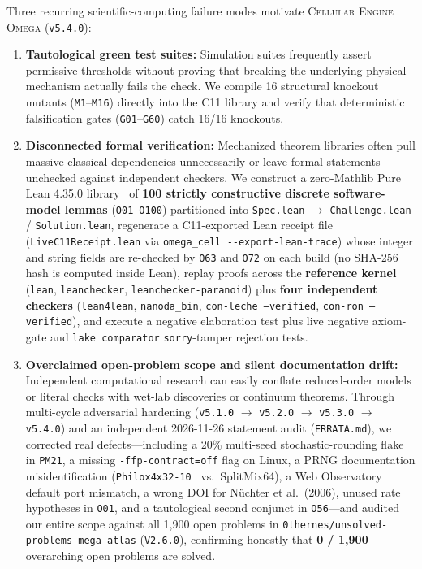 \documentclass[11pt,reqno]{amsart}
\begin{document}
Three recurring scientific-computing failure modes motivate \textsc{Cellular Engine Omega} (\texttt{v5.4.0}):
\begin{enumerate}
  \item \textbf{Tautological green test suites:} Simulation suites frequently assert permissive thresholds without proving that breaking the underlying physical mechanism actually fails the check. We compile 16 structural knockout mutants (\texttt{M1}--\texttt{M16}) directly into the C11 library and verify that deterministic falsification gates (\texttt{G01}--\texttt{G60}) catch 16/16 knockouts.
  \item \textbf{Disconnected formal verification:} Mechanized theorem libraries often pull massive classical dependencies unnecessarily or leave formal statements unchecked against independent checkers. We construct a zero-Mathlib Pure Lean 4.35.0 library~\cite{demoura2021lean4} of \textbf{100 strictly constructive discrete software-model lemmas} (\texttt{O01}--\texttt{O100}) partitioned into \texttt{Spec.lean} $\to$ \texttt{Challenge.lean} / \texttt{Solution.lean}, regenerate a C11-exported Lean receipt file (\nolinkurl{LiveC11Receipt.lean} via \nolinkurl{omega_cell --export-lean-trace}) whose integer and string fields are re-checked by \texttt{O63} and \texttt{O72} on each build (no SHA-256 hash is computed inside Lean), replay proofs across the \textbf{reference kernel} (\texttt{lean}, \texttt{leanchecker}, \texttt{leanchecker-paranoid}) plus \textbf{four independent checkers} (\texttt{lean4lean}, \texttt{nanoda\_bin}, \texttt{con-leche --verified}, \texttt{con-ron --verified}), and execute a negative elaboration test plus live negative axiom-gate and \texttt{lake comparator} \texttt{sorry}-tamper rejection tests.
  \item \textbf{Overclaimed open-problem scope and silent documentation drift:} Independent computational research can easily conflate reduced-order models or literal checks with wet-lab discoveries or continuum theorems. Through multi-cycle adversarial hardening (\texttt{v5.1.0} $\to$ \texttt{v5.2.0} $\to$ \texttt{v5.3.0} $\to$ \texttt{v5.4.0}) and an independent 2026-11-26 statement audit (\nolinkurl{ERRATA.md}), we corrected real defects---including a 20\% multi-seed stochastic-rounding flake in \texttt{PM21}, a missing \texttt{-ffp-contract=off} flag on Linux, a PRNG documentation misidentification (\texttt{Philox4x32-10}~\cite{salmon2011parallel} vs.\ SplitMix64), a Web Observatory default port mismatch, a wrong DOI for N\"uchter et al.\ (2006), unused rate hypotheses in \texttt{O01}, and a tautological second conjunct in \texttt{O56}---and audited our entire scope against all 1,900 open problems in \nolinkurl{0thernes/unsolved-problems-mega-atlas} (\texttt{V2.6.0}), confirming honestly that \textbf{0 / 1,900} overarching open problems are solved.
\end{enumerate}
\end{document}
